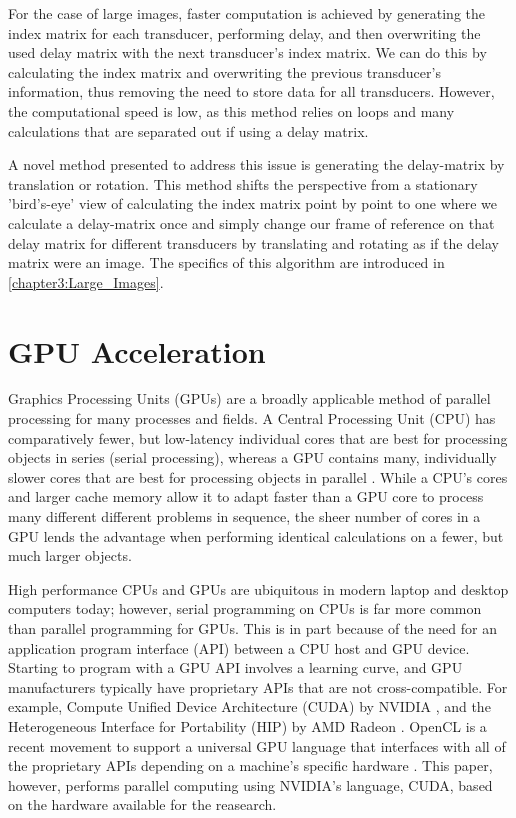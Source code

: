     For the case of large images, faster computation is achieved by generating the index matrix for each transducer, performing delay, and then overwriting the used delay matrix with the next transducer's index matrix. We can do this by calculating the index matrix and overwriting the previous transducer's information, thus removing the need to store data for all transducers. However, the computational speed is low, as this method relies on loops and many calculations that are separated out if using a delay matrix.

    A novel method presented to address this issue is generating the delay-matrix by translation or rotation. This method shifts the perspective from a stationary 'bird's-eye' view of calculating the index matrix point by point to one where we calculate a delay-matrix once and simply change our frame of reference on that delay matrix for different transducers by translating and rotating as if the delay matrix were an image. The specifics of this algorithm are introduced in \ref{chapter3:Large_Images}.

\section{GPU Acceleration}
\label{chapter2:gpu_accel}

    Graphics Processing Units (GPUs) are a broadly applicable method of parallel processing for many processes and fields. A Central Processing Unit (CPU) has comparatively fewer, but low-latency individual cores that are best for processing objects in series (serial processing), whereas a GPU contains many, individually slower cores that are best for processing objects in parallel \cite{caulfieldCPUVsGPU2009}. While a CPU's cores and larger cache memory allow it to adapt faster than a GPU core to process many different different problems in sequence, the sheer number of cores in a GPU lends the advantage when performing identical calculations on a fewer, but much larger objects.

    High performance CPUs and GPUs are ubiquitous in modern laptop and desktop computers today; however, serial programming on CPUs is far more common than parallel programming for GPUs. This is in part because of the need for an application program interface (API) between a CPU host and GPU device. Starting to program with a GPU API involves a learning curve, and GPU manufacturers typically have proprietary APIs that are not cross-compatible. For example, Compute Unified Device Architecture (CUDA) by NVIDIA \cite{CUDAZoneLibrary2017}, and the Heterogeneous Interface for Portability (HIP) by AMD Radeon \cite{IntroductionHIPFAQ}. OpenCL is a recent movement to support a universal GPU language that interfaces with all of the proprietary APIs depending on a machine's specific hardware \cite{OpenCLOpenStandard2013}. This paper, however, performs parallel computing using NVIDIA's language, CUDA, based on the hardware available for the reasearch.


